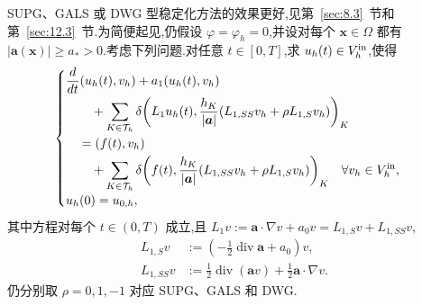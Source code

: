 SUPG、GALS 或 DWG 型稳定化方法的效果更好,见第~\ref{sec:8.3}~节和第~\ref{sec:12.3}~节.为简便起见,仍假设 \(\varphi=\varphi_h=0\),并设对每个 \(\boldsymbol{x}\in\Omega\) 都有 \(|\boldsymbol{a}(\boldsymbol{x})|\ge a_*>0\).考虑下列问题.对任意 \(t\in[0,T]\),求 \(u_h(t)\in V_h^{\rm in}\),使得
\begin{equation}\label{eq:14.3.17}
  \begin{cases}
    \begin{aligned}
      &\dfrac{d}{dt}(u_h(t),v_h)+a_1(u_h(t),v_h)\\
      &\qquad+\displaystyle\sum_{K\in\mathcal T_h}\delta
            \biggl(L_1u_h(t),\frac{h_K}{|\boldsymbol{a}|}(L_{1,SS}v_h+\rho L_{1,S}v_h)\biggr)_K\\
      &\quad=(f(t),v_h)\\
      &\qquad+\displaystyle\sum_{K\in\mathcal T_h}\delta
            \biggl(f(t),\frac{h_K}{|\boldsymbol{a}|}(L_{1,SS}v_h+\rho L_{1,S}v_h)\biggr)_K
            \quad\forall v_h\in V_h^{\rm in},
    \end{aligned}\\[2pt]
    u_h(0)=u_{0,h},
  \end{cases}
\end{equation}
其中方程对每个 \(t\in(0,T)\) 成立,且 \(L_1v:=\boldsymbol{a}\cdot\nabla v+a_0v=L_{1,S}v+L_{1,SS}v\),
\begin{equation}\label{eq:14.3.18}
  \begin{aligned}
    L_{1,S}v&:=(-\tfrac12\operatorname{div}\boldsymbol{a}+a_0)v,\\
    L_{1,SS}v&:=\tfrac12\operatorname{div}(\boldsymbol{a} v)
                 +\tfrac12\boldsymbol{a}\cdot\nabla v.
  \end{aligned}
\end{equation}
仍分别取 \(\rho=0,1,-1\) 对应 SUPG、GALS 和 DWG.

